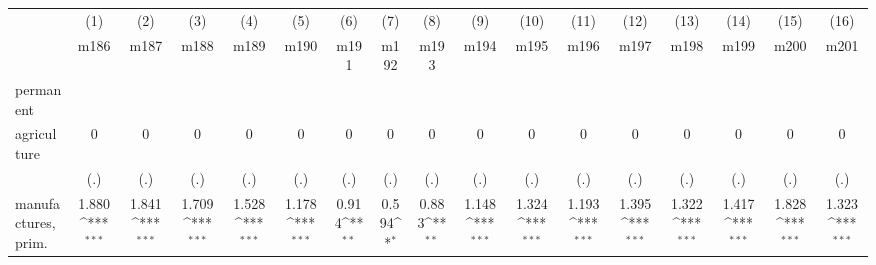 {
\def\sym#1{\ifmmode^{#1}\else\(^{#1}\)\fi}
\begin{tabular}{l*{16}{c}}
\hline\hline
                    &\multicolumn{1}{c}{(1)}&\multicolumn{1}{c}{(2)}&\multicolumn{1}{c}{(3)}&\multicolumn{1}{c}{(4)}&\multicolumn{1}{c}{(5)}&\multicolumn{1}{c}{(6)}&\multicolumn{1}{c}{(7)}&\multicolumn{1}{c}{(8)}&\multicolumn{1}{c}{(9)}&\multicolumn{1}{c}{(10)}&\multicolumn{1}{c}{(11)}&\multicolumn{1}{c}{(12)}&\multicolumn{1}{c}{(13)}&\multicolumn{1}{c}{(14)}&\multicolumn{1}{c}{(15)}&\multicolumn{1}{c}{(16)}\\
                    &\multicolumn{1}{c}{m186}&\multicolumn{1}{c}{m187}&\multicolumn{1}{c}{m188}&\multicolumn{1}{c}{m189}&\multicolumn{1}{c}{m190}&\multicolumn{1}{c}{m191}&\multicolumn{1}{c}{m192}&\multicolumn{1}{c}{m193}&\multicolumn{1}{c}{m194}&\multicolumn{1}{c}{m195}&\multicolumn{1}{c}{m196}&\multicolumn{1}{c}{m197}&\multicolumn{1}{c}{m198}&\multicolumn{1}{c}{m199}&\multicolumn{1}{c}{m200}&\multicolumn{1}{c}{m201}\\
\hline
permanent           &                     &                     &                     &                     &                     &                     &                     &                     &                     &                     &                     &                     &                     &                     &                     &                     \\
agriculture         &           0         &           0         &           0         &           0         &           0         &           0         &           0         &           0         &           0         &           0         &           0         &           0         &           0         &           0         &           0         &           0         \\
                    &         (.)         &         (.)         &         (.)         &         (.)         &         (.)         &         (.)         &         (.)         &         (.)         &         (.)         &         (.)         &         (.)         &         (.)         &         (.)         &         (.)         &         (.)         &         (.)         \\
[1em]
manufactures, prim. &       1.880\sym{***}&       1.841\sym{***}&       1.709\sym{***}&       1.528\sym{***}&       1.178\sym{***}&       0.914\sym{**} &       0.594\sym{*}  &       0.883\sym{**} &       1.148\sym{***}&       1.324\sym{***}&       1.193\sym{***}&       1.395\sym{***}&       1.322\sym{***}&       1.417\sym{***}&       1.828\sym{***}&       1.323\sym{***}\\

\end{tabular}}
